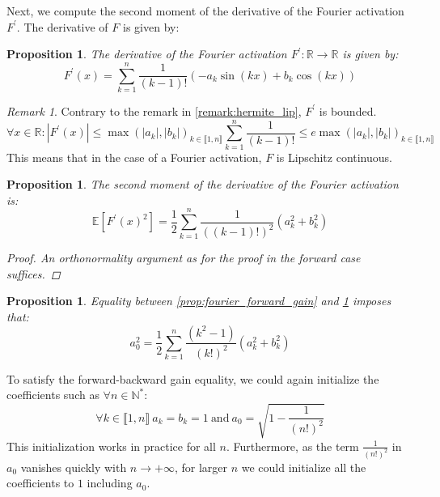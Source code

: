 \documentclass{article} %
\theoremstyle{plain}
\newtheorem{proposition}[theorem]{Proposition}
\theoremstyle{definition}
\theoremstyle{remark}
\newtheorem{remark}[theorem]{Remark}
\begin{document}
Next, we compute the second moment of the derivative of the Fourier activation \( F^\prime \). The derivative of \( F \) is given by:
\begin{proposition}
The derivative of the Fourier activation \( F^\prime \colon  \mathbb{R} \to \mathbb{R} \) is given by:
\begin{equation}
    F^\prime(x) = \sum_{k=1}^{n}\frac{1}{(k-1)!}\left(-a_k \sin(kx) + b_k \cos(kx)\right)
\end{equation}    
\end{proposition}
\begin{remark}
    Contrary to the remark in \ref{remark:hermite_lip}, $F^\prime$ is bounded. 
\begin{equation}
    \forall x \in \mathbb{R} \colon |F^\prime(x)| \leq \operatorname{max}(|a_k|,|b_k|)_{k \in \llbracket 1,n\rrbracket} \sum_{k=1}^{n} \frac{1}{(k-1)!} \leq e\operatorname{max}(|a_k|,|b_k|)_{k \in \llbracket 1,n\rrbracket} 
\end{equation}
This means that in the case of a Fourier activation, $F$ is Lipschitz continuous.
\end{remark} 
\begin{proposition}
\label{prop:fourier_backward_gain}
The second moment of the derivative of the Fourier activation is:
 \begin{equation}
    \mathbb{E}\left[F^\prime(x)^2\right]=\frac{1}{2}\sum^{n}_{k=1}\frac{1}{((k-1)!)^2} (a_k^2 + b_k^2)
\end{equation}
\begin{proof}
    An orthonormality argument as for the proof in the forward case suffices.
\end{proof}
\end{proposition}
\begin{proposition}
\label{prop:fourier_equality}
    Equality between \ref{prop:fourier_forward_gain} and \ref{prop:fourier_backward_gain} imposes that:
\begin{equation}
    a_0^2 = \frac{1}{2}\sum^{n}_{k=1} \frac{(k^2 - 1)}{(k!)^2}(a_k^2 + b_k^2)
\end{equation}
\end{proposition}

To satisfy the forward-backward gain equality, we could again initialize the coefficients such as $\forall n \in \mathbb{N}^*$:
\small
\begin{equation}
     \forall k \in   \llbracket 1,n \rrbracket \ a_k = b_k = 1 \ \text{and} \  a_0 = \sqrt{1 - \frac{1}{(n!)^2}}
\end{equation}
\normalsize
This initialization works in practice for all $n$. Furthermore, as the term $\frac{1}{(n!)^2}$ in $a_0$ vanishes quickly with $n \rightarrow +\infty$, for larger $n$ we could initialize all the coefficients to $1$ including $a_0$.
\end{document}
